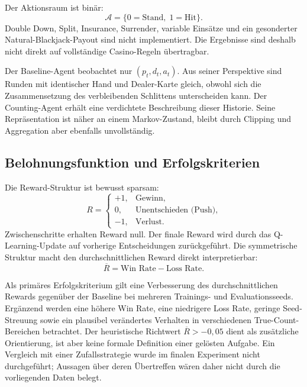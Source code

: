 Der Aktionsraum ist binär:
\begin{equation}
  \mathcal{A}=\{0=\text{Stand},\;1=\text{Hit}\}.
\end{equation}
Double Down, Split, Insurance, Surrender, variable Einsätze und ein
gesonderter Natural-Blackjack-Payout sind nicht implementiert. Die
Ergebnisse sind deshalb nicht direkt auf vollständige Casino-Regeln übertragbar.

Der Baseline-Agent beobachtet nur $(p_t,d_t,a_t)$. Aus seiner
Perspektive sind Runden mit identischer Hand und Dealer-Karte gleich,
obwohl sich die Zusammensetzung des verbleibenden Schlittens
unterscheiden kann. Der Counting-Agent erhält eine verdichtete
Beschreibung dieser Historie. Seine Repräsentation ist näher an einem
Markov-Zustand, bleibt durch Clipping und Aggregation aber ebenfalls
unvollständig.

\subsection{Belohnungsfunktion und Erfolgskriterien}

Die Reward-Struktur ist bewusst sparsam:
\begin{equation}
  R =
  \begin{cases}
    +1, & \text{Gewinn},\\
    0,  & \text{Unentschieden (Push)},\\
    -1, & \text{Verlust}.
  \end{cases}
\end{equation}
Zwischenschritte erhalten Reward null. Der finale Reward wird durch
das Q-Learning-Update auf vorherige Entscheidungen zurückgeführt. Die
symmetrische Struktur macht den durchschnittlichen Reward direkt
interpretierbar:
\begin{equation}
  \overline{R}=\text{Win Rate}-\text{Loss Rate}.
\end{equation}

Als primäres Erfolgskriterium gilt eine Verbesserung des
durchschnittlichen Rewards gegenüber der Baseline bei mehreren
Trainings- und Evaluationsseeds. Ergänzend werden eine höhere Win
Rate, eine niedrigere Loss Rate, geringe Seed-Streuung sowie ein
plausibel verändertes Verhalten in verschiedenen True-Count-Bereichen
betrachtet. Der heuristische Richtwert $\overline{R}>-0{,}05$ dient
als zusätzliche Orientierung, ist aber keine formale Definition einer
gelösten Aufgabe. Ein Vergleich mit einer Zufallsstrategie wurde im
finalen Experiment nicht durchgeführt; Aussagen über deren
Übertreffen wären daher nicht durch die vorliegenden Daten belegt.

